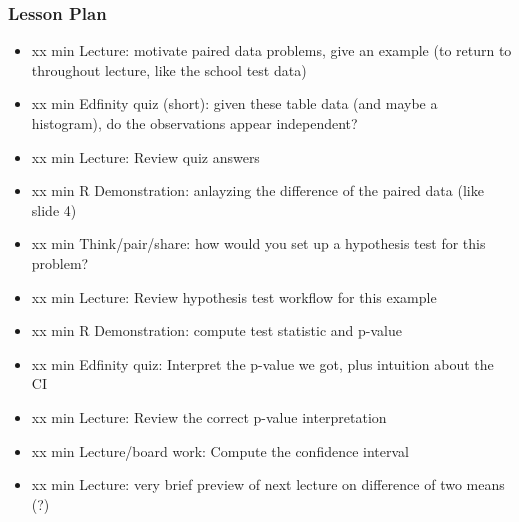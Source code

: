 \begin{frame}
    \frametitle{Lesson Plan}
    \begin{itemize}
        \item xx min Lecture: motivate paired data problems, give an example (to return to throughout lecture, like the school test data)   
        \item xx min Edfinity quiz (short): given these table data (and maybe a histogram), do the observations appear independent?
        \item xx min Lecture: Review quiz answers
        \item xx min R Demonstration: anlayzing the difference of the paired data (like slide 4)
        \item xx min Think/pair/share: how would you set up a hypothesis test for this problem?
        \item xx min Lecture: Review hypothesis test workflow for this example
        \item xx min R Demonstration: compute test statistic and p-value 
        \item xx min Edfinity quiz: Interpret the p-value we got, plus intuition about the CI
        \item xx min Lecture: Review the correct p-value interpretation
        \item xx min Lecture/board work: Compute the confidence interval
        \item xx min Lecture: very brief preview of next lecture on difference of two means (?)
    \end{itemize}

\end{frame}
            
